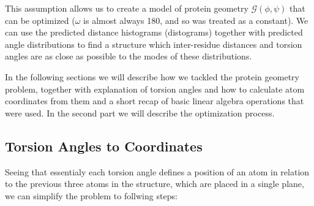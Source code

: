 This assumption allows us to create a model of protein geometry $\mathcal{G}(\phi, \psi)$ that can be optimized ($\omega$ is almost always 180\degree, and so was treated as a constant). We can use the predicted distance histograms (distograms) together with predicted angle distributions to find a structure which inter-residue distances and torsion angles are as close as possible to the modes of these distributions.

In the following sections we will describe how we tackled the protein geometry problem, together with explanation of torsion angles and how to calculate atom coordinates from them and a short recap of basic linear algebra operations that were used. In the second part we will describe the optimization process.

\subsection{Torsion Angles to Coordinates}




Seeing that essentialy each torsion angle defines a position of an atom in relation to the previous three atoms in the structure, which are placed in a single plane, we can simplify the problem to follwing steps:

